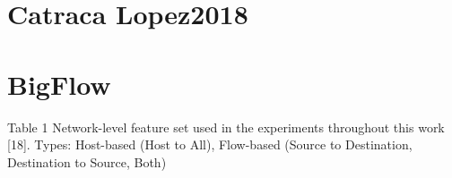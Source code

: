 
\section{Catraca Lopez2018}

\cite{Lopez2018}



\section{BigFlow}

Table 1
Network-level feature set used in the experiments throughout this work [18].
Types: Host-based (Host to All), Flow-based (Source to Destination, Destination to Source, Both)

